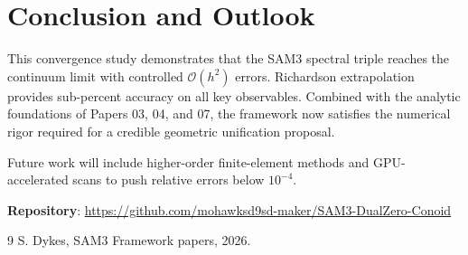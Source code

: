 \documentclass[11pt,a4paper]{article}
\begin{document}
\section{Conclusion and Outlook}
This convergence study demonstrates that the SAM3 spectral triple reaches the continuum limit with controlled \(\mathcal{O}(h^2)\) errors. Richardson extrapolation provides sub-percent accuracy on all key observables. Combined with the analytic foundations of Papers 03, 04, and 07, the framework now satisfies the numerical rigor required for a credible geometric unification proposal.

Future work will include higher-order finite-element methods and GPU-accelerated scans to push relative errors below \(10^{-4}\).

\textbf{Repository}: \url{https://github.com/mohawksd9sd-maker/SAM3-DualZero-Conoid}

\begin{thebibliography}{9}
 S. Dykes, SAM3 Framework papers, 2026.
\end{thebibliography}
\end{document}
